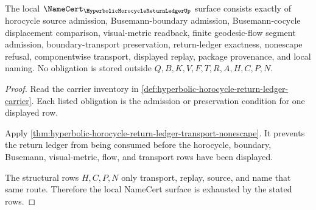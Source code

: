 \begin{theorem}
\label{thm:hyperbolic-horocycle-return-ledger-obligations}
The local $\NameCert_{\HyperbolicHorocycleReturnLedgerUp}$ surface consists exactly of horocycle source admission, Busemann-boundary admission, Busemann-cocycle displacement comparison, visual-metric readback, finite geodesic-flow segment admission, boundary-transport preservation, return-ledger exactness, nonescape refusal, componentwise transport, displayed replay, package provenance, and local naming. No obligation is stored outside $Q,B,K,V,F,T,R,A,H,C,P,N$.
\end{theorem}
\begin{proof}
Read the carrier inventory in \autoref{def:hyperbolic-horocycle-return-ledger-carrier}. Each listed obligation is the admission or preservation condition for one displayed row.

Apply \autoref{thm:hyperbolic-horocycle-return-ledger-transport-nonescape}. It prevents the return ledger from being consumed before the horocycle, boundary, Busemann, visual-metric, flow, and transport rows have been displayed.

The structural rows $H,C,P,N$ only transport, replay, source, and name that same route. Therefore the local NameCert surface is exhausted by the stated rows.
\end{proof}





